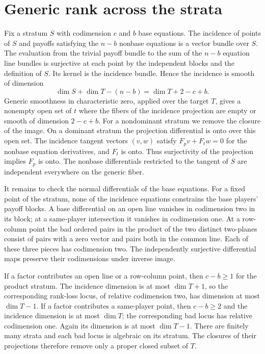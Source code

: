 \documentclass[11pt,a4paper]{amsart}
\begin{document}
\section{Generic rank across the strata}

Fix a stratum $S$ with codimension $c$ and $b$ base equations. The
incidence of points of $S$ and payoffs satisfying the $n-b$ nonbase
equations is a vector bundle over $S$. The evaluation from the
trivial payoff bundle to the sum of the $n-b$ equation line bundles
is surjective at each point by the independent blocks and the
definition of $S$. Its kernel is the incidence bundle. Hence the
incidence is smooth of dimension
\[
\dim S+\dim T-(n-b)=\dim T+2-c+b.
\]
Generic smoothness in characteristic zero, applied over the target
$T$, gives a nonempty open set of $t$ where the fibers of the
incidence projection are empty or smooth of dimension $2-c+b$.
For a nondominant stratum we remove the closure of the image.
On a dominant stratum the projection differential is onto over
this open set. The incidence tangent vectors $(v,w)$ satisfy
$F_pv+F_tw=0$ for the nonbase equation derivatives, and $F_t$ is onto.
Thus surjectivity of the projection implies $F_p$ is onto. The
nonbase differentials restricted to the tangent of $S$ are
independent everywhere on the generic fiber.

It remains to check the normal differentials of the base equations.
For a fixed point of the stratum, none of the incidence equations
constrains the base players' payoff blocks. A base differential on
an open line vanishes in codimension two in its block; at a
same-player intersection it vanishes in codimension one. At a
row-column point the bad ordered pairs in the product of the two
distinct two-planes consist of pairs with a zero vector and pairs
both in the common line. Each of these three pieces has codimension
two. The independently surjective differential maps preserve their
codimensions under inverse image.

If a factor contributes an open line or a row-column point, then
$c-b\geq 1$ for the product stratum. The incidence dimension is
at most $\dim T+1$, so the corresponding rank-loss locus, of
relative codimension two, has dimension at most $\dim T-1$.
If a factor contributes a same-player point, then $c-b\geq2$ and
the incidence dimension is at most $\dim T$; the corresponding
bad locus has relative codimension one. Again its dimension is at
most $\dim T-1$. There are finitely many strata and each bad locus
is algebraic on its stratum. The closures of their projections
therefore remove only a proper closed subset of $T$.
\end{document}

